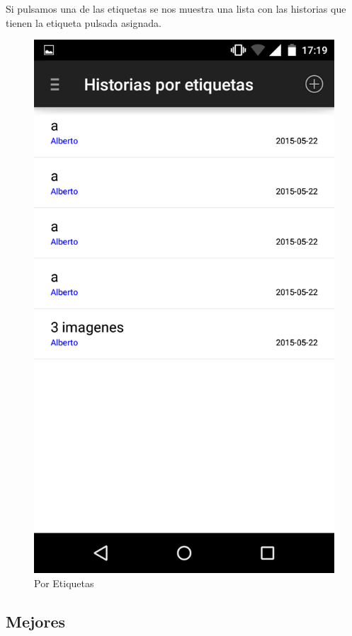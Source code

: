 \documentclass[11pt,a4paper, titlepage]{article}
\begin{document}
	Si pulsamos una de las etiquetas se nos muestra una lista con las historias que tienen la etiqueta pulsada asignada.
	
	\begin{figure}[hbtp]
		\centering
		\includegraphics[scale = 0.25 ]{img/7}
		\caption{Por Etiquetas}
		\label{p15}
	\end{figure}
	
	\FloatBarrier
	\subsection[Mejores]{Mejores}
	
\end{document}
